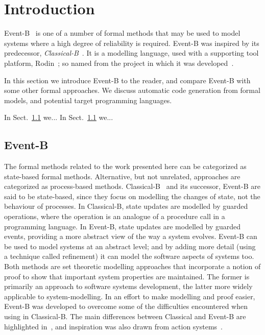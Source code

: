 \section{Introduction}
Event-B~\cite{ABR10} is one of a number of formal methods that may be used to model systems where a high degree of reliability is required. Event-B was inspired by its predecessor, \emph{Classical-B}~\cite{TheBBook}. It is a modelling language, used with a supporting tool platform, Rodin~\cite{abrial10rodin}; so named from the project in which it was developed~\cite{RodinTool}.  

In this section we introduce Event-B to the reader, and compare Event-B with some other formal approaches. We discuss automatic code generation from formal models, and potential target programming languages.

In Sect.~\ref{} we...
In Sect.~\ref{} we...

\subsection{Event-B}
The formal methods related to the work presented here can be categorized as state-based formal methods. Alternative, but not unrelated, approaches are categorized as process-based methods. Classical-B~\cite{TheBBook,CNP,CNPInterface,B4Free} and its successor, Event-B are said to be state-based, since they focus on modelling the changes of state, not the behaviour of processes. In Classical-B, state updates are modelled by guarded operations, where the operation is an analogue of a procedure call in a programming language. In Event-B, state updates are modelled by guarded events, providing a more abstract view of the way a system evolves. Event-B can be used to model systems at an abstract level; and by adding more detail (using a technique called refinement) it can model the software aspects of systems too. Both methods are set theoretic modelling approaches that incorporate a notion of proof to show that important system properties are maintained. The former is primarily an approach to software systems development, the latter more widely applicable to system-modelling. In an effort to make modelling and proof easier, Event-B was developed to overcome some of the difficulties encountered when using in Classical-B. The main differences between Classical and Event-B are highlighted in~\cite{Hallerstede07}, and inspiration was also drawn from action systems~\cite{Back1990133}.

